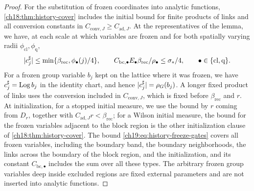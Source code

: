 \begin{proof}
For the substitution of frozen coordinates into analytic functions, \cref{ch18:thm:history-cover} includes the initial bound for finite products of links and all conversion constants in $C_{\mathrm{conv},J}\ge C_{\mathrm{ad},J}$. At the representatives of the lemma, we have, at each scale at which variables are frozen and for both spatially varying radii $\phi_{\mathrm{cl}},\phi_{\mathrm q}$,
\begin{equation}\label{ch19:eq:history-freeze-gates}
 \lvert c_j^\sharp\rvert\le\min\{\beta_{\mathrm{rec}},\phi_\bullet(j)/4\},\qquad
 C_{\mathrm{bc},\bullet}E_\bullet\beta_{\mathrm{rec}}/\rho_\bullet\le\sigma_*/4,
 \qquad\bullet\in\{\mathrm{cl},\mathrm q\}.
\end{equation}
For a frozen group variable $b_j$ kept on the lattice where it was frozen, we have $c_j^\sharp=\operatorname{Log} b_j$ in the identity chart, and hence $\lvert c_j^\sharp\rvert=\rho_G(b_j)$. A longer fixed product of links uses the conversion included in $C_{\mathrm{conv},J}$, which is fixed before $\beta_{\mathrm{rec}}$ and $r$. At initialization, for a stopped initial measure, we use the bound by $r$ coming from $D_r$, together with $C_{\mathrm{ad},J}r<\beta_{\mathrm{rec}}$; for a Wilson initial measure, the bound for the frozen variables adjacent to the block region is the other initialization clause of \cref{ch18:thm:history-cover}. The bound \eqref{ch19:eq:history-freeze-gates} covers all frozen variables, including the boundary band, the boundary neighborhoods, the links across the boundary of the block region, and the initialization, and its constant $C_{\mathrm{bc},\bullet}$ includes the sum over all these types. The arbitrary frozen group variables deep inside excluded regions are fixed external parameters and are not inserted into analytic functions.


\end{proof}
